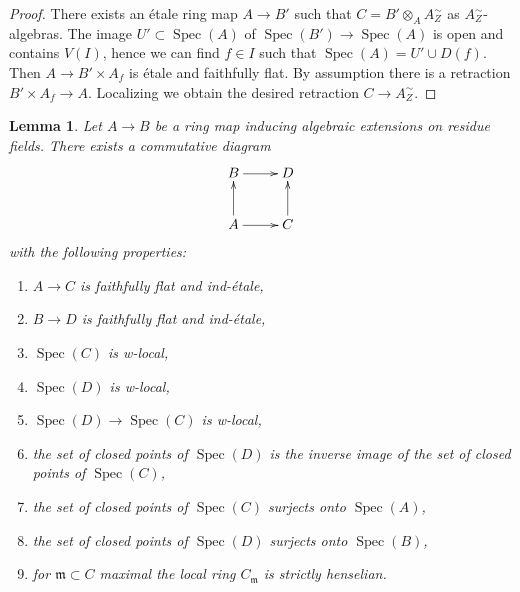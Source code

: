 \documentclass{stacks-project}
\theoremstyle{plain}
\newtheorem{lemma}[subsection]{Lemma}
\theoremstyle{definition}
\theoremstyle{remark}
\numberwithin{equation}{subsection}
\def\Spec{\mathop{\mathrm{Spec}}}
\begin{document}
\begin{proof}
There exists an \'etale ring map $A \to B'$ such that
$C = B' \otimes_A A_Z^\sim$ as $A_Z^\sim$-algebras.
The image $U' \subset \Spec(A)$ of $\Spec(B') \to \Spec(A)$
is open and contains $V(I)$, hence we can find $f \in I$ such
that $\Spec(A) = U' \cup D(f)$. Then $A \to B' \times A_f$
is \'etale and faithfully flat. By assumption there is a retraction
$B' \times A_f \to A$. Localizing we obtain the desired retraction
$C \to A_Z^\sim$.
\end{proof}

\begin{lemma}
\label{lemma-get-w-local-algebraic-residue-field-extensions}
Let $A \to B$ be a ring map inducing algebraic extensions on residue fields.
There exists a commutative diagram
$$
\xymatrix{
B \ar[r] & D \\
A \ar[r] \ar[u] & C \ar[u]
}
$$
with the following properties:
\begin{enumerate}
\item $A \to C$ is faithfully flat and ind-\'etale,
\item $B \to D$ is faithfully flat and ind-\'etale,
\item $\Spec(C)$ is w-local,
\item $\Spec(D)$ is w-local,
\item $\Spec(D) \to \Spec(C)$ is w-local,
\item the set of closed points of $\Spec(D)$ is the inverse image
of the set of closed points of $\Spec(C)$,
\item the set of closed points of $\Spec(C)$ surjects onto $\Spec(A)$,
\item the set of closed points of $\Spec(D)$ surjects onto $\Spec(B)$,
\item for $\mathfrak m \subset C$ maximal the local ring
$C_\mathfrak m$ is strictly henselian.
\end{enumerate}
\end{lemma}
\end{document}
